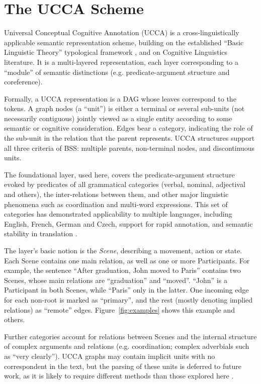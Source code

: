 \documentclass[11pt,letterpaper]{article}
\newcommand{\figref}[1]{Figure~\ref{#1}}
\begin{document}
\vspace{-.1cm}
\section{The UCCA Scheme}\label{sec:ucca}
Universal Conceptual Cognitive Annotation (UCCA)
is a cross-linguistically applicable semantic representation scheme,
building on the established ``Basic Linguistic Theory'' typological framework
\cite{Dixon:10b,Dixon:10a,Dixon:12}, and on Cognitive Linguistics literature.
It is a multi-layered representation, each layer corresponding to a ``module'' of
semantic distinctions (e.g. predicate-argument structure and coreference).

Formally, a UCCA representation is a DAG whose leaves correspond to the tokens.
A graph nodes (a ``unit'') is either a terminal or several
sub-units (not necessarily contiguous) jointly viewed as a
single entity according to some semantic or cognitive consideration.
Edges bear a category, indicating the role of the sub-unit in the relation that the parent represents.
UCCA structures support all three criteria of BSS: multiple parents, non-terminal nodes, and
discontinuous units.

The foundational layer, used here, covers the predicate-argument
structure evoked by predicates of all grammatical categories
(verbal, nominal, adjectival and others), the inter-relations between them,
and other major linguistic phenomena such as coordination and multi-word expressions.
This set of categories has demonstrated applicability to multiple languages, including
English, French, German and Czech, support for rapid annotation, and semantic stability in translation \cite{sulem2015conceptual}.

The layer's basic notion is the {\it Scene}, describing a movement, action or state.
Each Scene contains one main relation, as well as one or more Participants.
For example, the sentence ``After graduation, John moved to Paris'' contains two Scenes,
whose main relations are ``graduation'' and ``moved''. ``John'' is a Participant in both Scenes,
while ``Paris'' only in the latter.
One incoming edge for each non-root is marked as ``primary'',
and the rest (mostly denoting implied relations) as ``remote'' edges.
\figref{fig:examples} shows this example and others.

Further categories account for relations between Scenes and the internal structure of
complex arguments and relations
(e.g. coordination; complex adverbials such as ``very clearly'').
UCCA graphs may contain implicit
units with no correspondent in the text, but the parsing of these
units is deferred to future work, as it is likely to require different methods
than those explored here \cite{roth2015inducing}.
\end{document}
